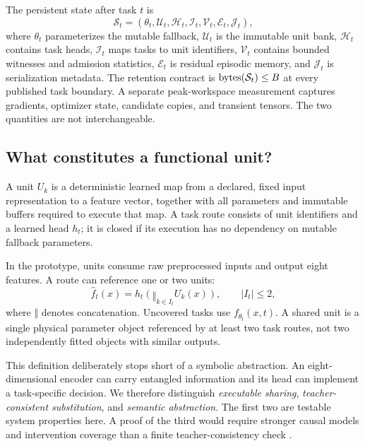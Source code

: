 \documentclass{article}
\begin{document}
The persistent state after task $t$ is
\begin{equation}
\mathcal{S}_t=(\theta_t,\mathcal{U}_t,\mathcal{H}_t,\mathcal{I}_t,
                    \mathcal{V}_t,\mathcal{E}_t,\mathcal{J}_t),
\end{equation}
where $\theta_t$ parameterizes the mutable fallback, $\mathcal{U}_t$ is the immutable unit bank, $\mathcal{H}_t$ contains task heads, $\mathcal{I}_t$ maps tasks to unit identifiers, $\mathcal{V}_t$ contains bounded witnesses and admission statistics, $\mathcal{E}_t$ is residual episodic memory, and $\mathcal{J}_t$ is serialization metadata. The retention contract is $\operatorname{bytes}(\mathcal{S}_t)\le B$ at every published task boundary. A separate peak-workspace measurement captures gradients, optimizer state, candidate copies, and transient tensors. The two quantities are not interchangeable.

\subsection{What constitutes a functional unit?}
\begin{definition}
A unit $U_k$ is a deterministic learned map from a declared, fixed input representation to a feature vector, together with all parameters and immutable buffers required to execute that map. A task route consists of unit identifiers and a learned head $h_t$; it is closed if its execution has no dependency on mutable fallback parameters.
\end{definition}
In the prototype, units consume raw preprocessed inputs and output eight features. A route can reference one or two units:
\begin{equation}
\hat f_t(x)=h_t\!\left(\mathop{\Vert}_{k\in I_t} U_k(x)\right),\qquad |I_t|\le2,
\label{eq:route}
\end{equation}
where $\Vert$ denotes concatenation. Uncovered tasks use $f_{\theta_t}(x,t)$. A shared unit is a single physical parameter object referenced by at least two task routes, not two independently fitted objects with similar outputs.

This definition deliberately stops short of a symbolic abstraction. An eight-dimensional encoder can carry entangled information and its head can implement a task-specific decision. We therefore distinguish \emph{executable sharing}, \emph{teacher-consistent substitution}, and \emph{semantic abstraction}. The first two are testable system properties here. A proof of the third would require stronger causal models and intervention coverage than a finite teacher-consistency check \cite{geiger2024}.
\end{document}
